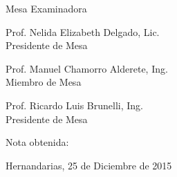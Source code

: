 

\vspace*{5\baselineskip}



\vspace*{5\baselineskip}
\hspace{.1\textwidth} %
\begin{minipage}{.8\textwidth}
		
\end{minipage}

\vspace*{2\baselineskip}
\begin{center}
	Mesa Examinadora\\	
	
	\vspace*{1\baselineskip}
	\makebox[3in]{\hrulefill}
	\par\noindent
	Prof. Nelida Elizabeth Delgado, Lic.\\
	Presidente de Mesa\\
	\vspace*{1\baselineskip}
	\makebox[3in]{\hrulefill}
	\par\noindent
	Prof. Manuel Chamorro Alderete, Ing.\\	
	Miembro de Mesa\\
	\vspace*{1\baselineskip}
	\makebox[3in]{\hrulefill}
	\par\noindent
	Prof. Ricardo Luis Brunelli, Ing.\\
	Presidente de Mesa\\
\end{center}
\vspace*{4\baselineskip}
Nota obtenida:

\vspace*{1\baselineskip}
\hspace{.5\textwidth} %
Hernandarias, 25 de Diciembre de 2015

